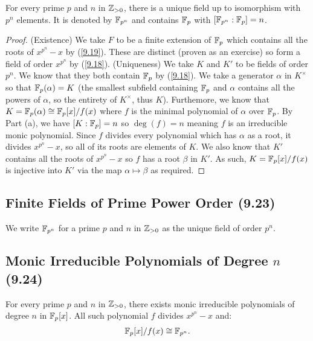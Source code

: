 For every prime $p$ and $n$ in $\mathbb{Z}_{> 0}$, there is a unique field up to isomorphism
with $p^n$ elements. It is denoted by $\mathbb{F}_{p^n}$ and contains $\mathbb{F}_p$ with
$[\mathbb{F}_{p^n} : \mathbb{F}_p] = n$.

\begin{proof}
    (Existence) We take $F$ to be a finite extension of $\mathbb{F}_p$ which contains
    all the roots of $x^{p^n} - x$ by (\ref{9.19}). These are distinct
    (proven as an exercise) so form a field of order $x^{p^n}$ by (\ref{9.18}).
    \bs
    (Uniqueness) We take $K$ and $K'$ to be fields of order $p^n$. We know that
    they both contain $\mathbb{F}_p$ by (\ref{9.18}). We take a generator $\alpha$ in
    $K^\times$ so that $\mathbb{F}_p(\alpha) = K$ (the smallest subfield containing
    $\mathbb{F}_p$ and $\alpha$ contains all the powers of $\alpha$, so the entirety of
    $K^\times$, thus $K$). Furthemore, we know that
    $K = \mathbb{F}_p(\alpha) \cong \mathbb{F}_p[x] / f(x)$
    where $f$ is the minimal polynomial of $\alpha$ over $\mathbb{F}_p$.
    \bs 
    By Part (a), we have $[K : \mathbb{F}_p] = n$ so $\deg(f) = n$ meaning $f$ is an
    irreducible monic polynomial. Since $f$ divides every polynomial which
    has $\alpha$ as a root, it divides $x^{p^n} - x$, so all of its roots
    are elements of $K$.
    We also know that $K'$ contains all the roots of $x^{p^n} - x$ so $f$ has a
    root $\beta$ in $K'$. As such, $K = \mathbb{F}_p[x]/f(x)$ is injective into
    $K'$ via the map $\alpha \mapsto \beta$ as required. 
\end{proof}

\subsection{Finite Fields of Prime Power Order (9.23)} \label{9.23}

We write $\mathbb{F}_{p^n}$ for a prime $p$ and $n$ in $\mathbb{Z}_{>0}$ as the unique
field of order $p^n$.

\subsection{Monic Irreducible Polynomials of Degree $n$ (9.24)} \label{9.24}

For every prime $p$ and $n$ in $\mathbb{Z}_{>0}$, there exists monic irreducible polynomials
of degree $n$ in $\mathbb{F}_p[x]$. All such polynomial $f$ divides $x^{p^n} - x$ and:
\begin{align*}
    \mathbb{F}_p[x]/f(x) \cong \mathbb{F}_{p^n}.
\end{align*}
